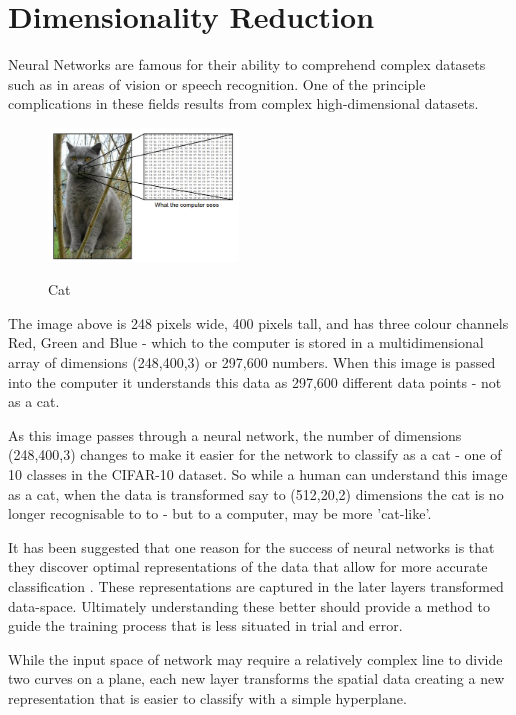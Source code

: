 \documentclass[a4paper,11pt,titlepage]{article}
\begin{document}
\section{Dimensionality Reduction}

Neural Networks are famous for their ability to comprehend complex datasets such as in areas of vision or speech recognition. One of the principle complications in these fields results from complex high-dimensional datasets.

 	\begin{figure}[H]
    			\centering	
			{{\includegraphics[width=0.45\textwidth]
    				{img/catimage.png} 
    			}}%
    			\caption{Cat}%
    		\label{fig:lascaux}
	\end{figure}
	
	The image above is 248 pixels wide, 400 pixels tall, and has three colour channels Red, Green and Blue - which to the computer is stored in a multidimensional array of dimensions (248,400,3) or 297,600 numbers. When this image is passed into the computer it understands this data as 297,600 different data points - not as a cat.
	\par 
	As this image passes through a neural network, the number of dimensions (248,400,3) changes to make it easier for the network to classify as a cat - one of 10 classes in the CIFAR-10 dataset. So while a human can understand this image as a cat, when the data is transformed say to (512,20,2) dimensions the cat is no longer recognisable to to - but to a computer, may be more 'cat-like'.
	\par 
	It has been suggested that one reason for the success of neural networks is that they discover optimal representations of the data that allow for more accurate classification \cite{Hinton1986}. These representations are captured in the later layers transformed data-space. Ultimately understanding these better should provide a method to guide the training process that is less situated in trial and error.
	\par 
	While the input space of network may require a relatively complex line to divide two curves on a plane, each new layer transforms the spatial data creating a new representation that is easier to classify with a simple hyperplane.
				
\end{document}
